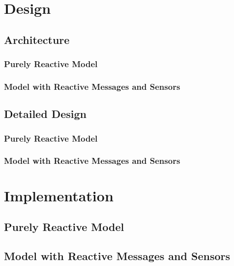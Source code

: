 \documentclass[12pt,a4paper,openright,twoside]{book}
\begin{document}
\chapter{Design}
\label{chap:design}

\section{Architecture}

\subsection{Purely Reactive Model}

\subsection{Model with Reactive Messages and Sensors}

\section{Detailed Design}

\subsection{Purely Reactive Model}

\subsection{Model with Reactive Messages and Sensors}

\chapter{Implementation}
\label{chap:implementation}

\section{Purely Reactive Model}

\section{Model with Reactive Messages and Sensors}
\end{document}
